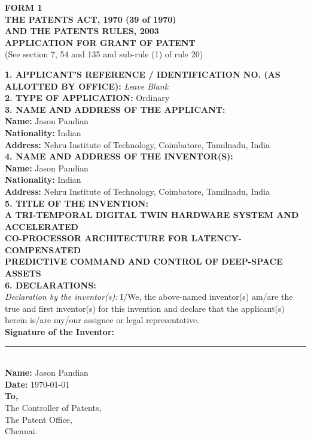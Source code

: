 \documentclass[12pt,a4paper]{article}
\begin{document}
\begin{center}
    \textbf{\large FORM 1} \\
    \vspace{0.3cm}
    \textbf{THE PATENTS ACT, 1970 (39 of 1970)} \\
    \textbf{AND THE PATENTS RULES, 2003} \\
    \vspace{0.5cm}
    \textbf{\large APPLICATION FOR GRANT OF PATENT} \\
    (See section 7, 54 and 135 and sub-rule (1) of rule 20)
\end{center}
\vspace{1cm}

\noindent \textbf{1. APPLICANT'S REFERENCE / IDENTIFICATION NO. (AS ALLOTTED BY OFFICE):} \textit{Leave Blank} \\

\noindent \textbf{2. TYPE OF APPLICATION:} Ordinary \\

\noindent \textbf{3. NAME AND ADDRESS OF THE APPLICANT:} \\
\textbf{Name:} Jason Pandian \\
\textbf{Nationality:} Indian \\
\textbf{Address:} Nehru Institute of Technology, Coimbatore, Tamilnadu, India \\

\noindent \textbf{4. NAME AND ADDRESS OF THE INVENTOR(S):} \\
\textbf{Name:} Jason Pandian \\
\textbf{Nationality:} Indian \\
\textbf{Address:} Nehru Institute of Technology, Coimbatore, Tamilnadu, India \\

\noindent \textbf{5. TITLE OF THE INVENTION:} \\
\textbf{A TRI-TEMPORAL DIGITAL TWIN HARDWARE SYSTEM AND ACCELERATED \\ CO-PROCESSOR ARCHITECTURE FOR LATENCY-COMPENSATED \\ PREDICTIVE COMMAND AND CONTROL OF DEEP-SPACE ASSETS} \\

\noindent \textbf{6. DECLARATIONS:} \\
\textit{Declaration by the inventor(s):} I/We, the above-named inventor(s) am/are the true and first inventor(s) for this invention and declare that the applicant(s) herein is/are my/our assignee or legal representative. \\

\vspace{2cm}
\noindent \textbf{Signature of the Inventor:} \rule{4cm}{0.4pt} \\
\textbf{Name:} Jason Pandian \\
\textbf{Date:} \today \\

\vspace{1.5cm}
\noindent \textbf{To,} \\
The Controller of Patents, \\
The Patent Office, \\
Chennai.
\end{document}

